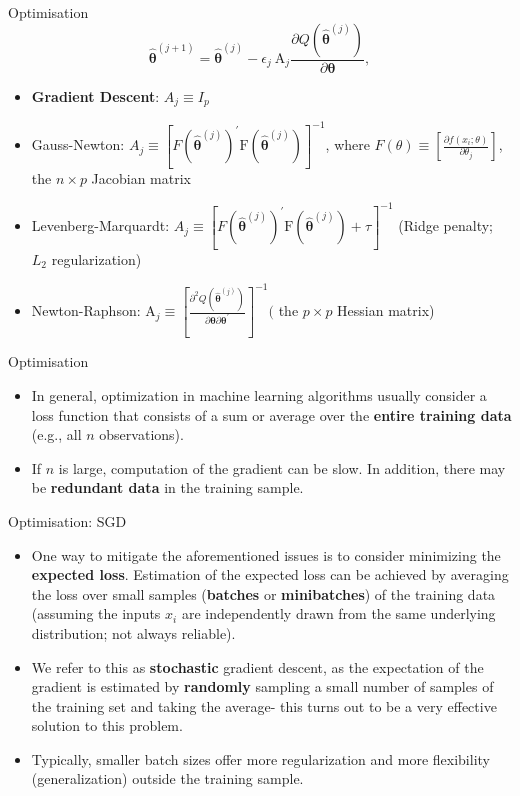 \documentclass{beamer}
\begin{document}
\begin{frame}{Optimisation}
$$
\hat{\boldsymbol{\theta}}^{(j+1)}=\hat{\boldsymbol{\theta}}^{(j)}-\epsilon_{j} \mathrm{~A}_{j} \frac{\partial Q\left(\hat{\boldsymbol{\theta}}^{(j)}\right)}{\partial \boldsymbol{\theta}},
$$
\begin{itemize}
\item \textbf{Gradient Descent}: $A_{j} \equiv I_{p}$
\item Gauss-Newton: $A_{j} \equiv\left[F\left(\hat{\boldsymbol{\theta}}^{(j)}\right)^{\prime} \mathrm{F}\left(\hat{\boldsymbol{\theta}}^{(j)}\right)\right]^{-1}$, where $F(\theta) \equiv\left[\frac{\partial f\left(x_{i} ; \theta\right)}{\partial \theta_{j}}\right]$, the $n \times p$ Jacobian matrix
\item Levenberg-Marquardt: $A_{j} \equiv\left[F\left(\hat{\boldsymbol{\theta}}^{(j)}\right)^{\prime} \mathrm{F}\left(\hat{\boldsymbol{\theta}}^{(j)}\right)+\tau \right]^{-1}$ (Ridge penalty; $L_{2}$ regularization)
\item Newton-Raphson: $\mathrm{A}_{j} \equiv\left[\frac{\partial^{2} Q\left(\hat{\boldsymbol{\theta}}^{(j)}\right)}{\partial \boldsymbol{\theta} \partial \boldsymbol{\theta}^{\prime}}\right]^{-1}($ the $p \times p$ Hessian matrix)
\end{itemize}
\end{frame}
\begin{frame}{Optimisation}
\begin{itemize}
\item In general, optimization in machine learning algorithms usually consider a loss function that consists of a sum or average over the \textbf{entire training data} (e.g., all $n$ observations).
\item If $n$ is large, computation of the gradient can be slow. In addition, there may be \textbf{redundant data} in the training sample.
\end{itemize}
\end{frame}
\begin{frame}{Optimisation: SGD}
\begin{itemize}
\item One way to mitigate the aforementioned issues is to consider minimizing the \textbf{expected loss}. Estimation of the expected loss can be achieved by averaging the loss over small samples (\textbf{batches} or \textbf{minibatches}) of the training data (assuming the inputs $x_{i}$ are independently drawn from the same underlying distribution; not always reliable).
\item We refer to this as \textbf{stochastic} gradient descent, as the expectation of the gradient is estimated by \textbf{randomly} sampling a small number of samples of the training set and taking the average- this turns out to be a very effective solution to this problem.
\item Typically, smaller batch sizes offer more regularization and more flexibility (generalization) outside the training sample.
\end{itemize}
\end{frame}
\end{document}
